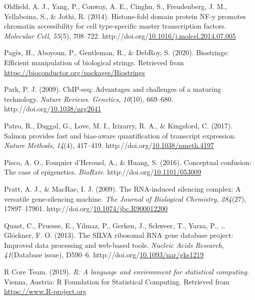 \documentclass[12pt,twoside]{reedthesis}
\newlength{\cslhangindent}
\newenvironment{CSLReferences}[2] %
 {%
  \setlength{\parindent}{0pt}
  \ifodd #1 \everypar{\setlength{\hangindent}{\cslhangindent}}\ignorespaces\fi
  \ifnum #2 > 0
  \setlength{\parskip}{#2\baselineskip}
  \fi
 }%
 {}
\begin{document}
\begin{CSLReferences}{1}{0}
\leavevmode{}%
Oldfield, A. J., Yang, P., Conway, A. E., Cinghu, S., Freudenberg, J. M., Yellaboina, S., \& Jothi, R. (2014). Histone-fold domain protein NF-y promotes chromatin accessibility for cell type-specific master transcription factors. \emph{Molecular Cell}, \emph{55}(5), 708--722. http://doi.org/\href{https://doi.org/10.1016/j.molcel.2014.07.005}{10.1016/j.molcel.2014.07.005}

\leavevmode{}%
Pagès, H., Aboyoun, P., Gentleman, R., \& DebRoy, S. (2020). Biostrings: Efficient manipulation of biological strings. Retrieved from \url{https://bioconductor.org/packages/Biostrings}

\leavevmode{}%
Park, P. J. (2009). ChIP-seq: Advantages and challenges of a maturing technology. \emph{Nature Reviews. Genetics}, \emph{10}(10), 669--680. http://doi.org/\href{https://doi.org/10.1038/nrg2641}{10.1038/nrg2641}

\leavevmode{}%
Patro, R., Duggal, G., Love, M. I., Irizarry, R. A., \& Kingsford, C. (2017). Salmon provides fast and bias-aware quantification of transcript expression. \emph{Nature Methods}, \emph{14}(4), 417--419. http://doi.org/\href{https://doi.org/10.1038/nmeth.4197}{10.1038/nmeth.4197}

\leavevmode{}%
Pisco, A. O., Fouquier d'Herouel, A., \& Huang, S. (2016). Conceptual confusion: The case of epigenetics. \emph{BioRxiv}. http://doi.org/\href{https://doi.org/10.1101/053009}{10.1101/053009}

\leavevmode{}%
Pratt, A. J., \& MacRae, I. J. (2009). The RNA-induced silencing complex: A versatile gene-silencing machine. \emph{The Journal of Biological Chemistry}, \emph{284}(27), 17897--17901. http://doi.org/\href{https://doi.org/10.1074/jbc.R900012200}{10.1074/jbc.R900012200}

\leavevmode{}%
Quast, C., Pruesse, E., Yilmaz, P., Gerken, J., Schweer, T., Yarza, P., \ldots{} Glöckner, F. O. (2013). The SILVA ribosomal RNA gene database project: Improved data processing and web-based tools. \emph{Nucleic Acids Research}, \emph{41}(Database issue), D590--6. http://doi.org/\href{https://doi.org/10.1093/nar/gks1219}{10.1093/nar/gks1219}

\leavevmode{}%
R Core Team. (2019). \emph{R: A language and environment for statistical computing}. Vienna, Austria: R Foundation for Statistical Computing. Retrieved from \url{https://www.R-project.org}


\end{CSLReferences}
\end{document}
